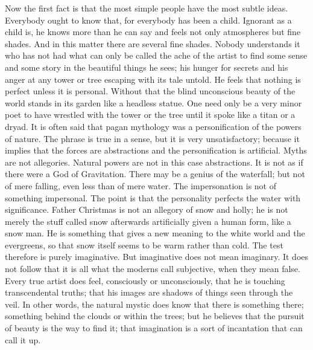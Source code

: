 Now the first fact is that the most simple people have the most subtle ideas. Everybody ought to know that, for everybody has been a child. Ignorant as a child is, he knows more than he can say and feels not only atmospheres but fine shades. And in this matter there are several fine shades. Nobody understands it who has not had what can only be called the ache of the artist to find some sense and some story in the beautiful things he sees; his hunger for secrets and his anger at any tower or tree escaping with its tale untold. He feels that nothing is perfect unless it is personal. Without that the blind unconscious beauty of the world stands in its garden like a headless statue. One need only be a very minor poet to have wrestled with the tower or the tree until it spoke like a titan or a dryad. It is often said that pagan mythology was a personification of the powers of nature. The phrase is true in a sense, but it is very unsatisfactory; because it implies that the forces are abstractions and the personification is artificial. Myths are not allegories. Natural powers are not in this case abstractions. It is not as if there were a God of Gravitation. There may be a genius of the waterfall; but not of mere falling, even less than of mere water. The impersonation is not of something impersonal. The point is that the personality perfects the water with significance. Father Christmas is not an allegory of snow and holly; he is not merely the stuff called snow afterwards artificially given a human form, like a snow man. He is something that gives a new meaning to the white world and the evergreens, so that snow itself seems to be warm rather than cold. The test therefore is purely imaginative. But imaginative does not mean imaginary. It does not follow that it is all what the moderns call subjective, when they mean false. Every true artist does feel, consciously or unconsciously, that he is touching transcendental truths; that his images are shadows of things seen through the veil. In other words, the natural mystic does know that there is something there; something behind the clouds or within the trees; but he believes that the pursuit of beauty is the way to find it; that imagination is a sort of incantation that can call it up.

